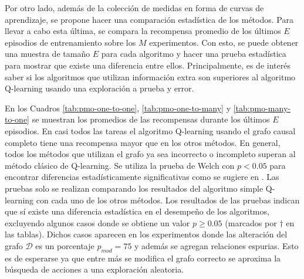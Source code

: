 Por otro lado, además de la colección de medidas en forma de curvas de aprendizaje, se propone hacer una comparación estadística de
los métodos. Para llevar a cabo esta última, se compara la recompensa promedio de los últimos $E$ episodios
de entrenamiento sobre los $M$ experimentos. Con esto, se 
puede obtener una muestra de tamaño $E$ para cada algoritmo
y hacer una prueba estadística para mostrar que existe una diferencia entre ellos. Principalmente, es de interés saber si los algoritmos que utilizan información extra son superiores 
al algoritmo Q-learning usando una exploración a prueba y error. 

En los Cuadros \ref{tab:pmo-one-to-one}, \ref{tab:pmo-one-to-many} y \ref{tab:pmo-many-to-one} se muestran
los promedios de las recompensas durante los últimos $E$ episodios. En casi todos las tareas el algoritmo Q-learning usando el grafo causal completo tiene una recompensa mayor que en los otros métodos. En general, todos los métodos que utilizan el grafo ya sea incorrecto o incompleto superan al método clásico de Q-learning. Se utiliza la prueba de Welch con $p < 0.05$ para encontrar diferencias estadísticamente significativas como se sugiere en \cite{colas2019hitchhikers}. Las pruebas solo se realizan comparando los resultados del algoritmo simple Q-learning con cada uno de los otros métodos. Los resultados de las pruebas indican que sí existe una diferencia estadística en el desempeño de los algoritmos, excluyendo algunos casos donde se obtiene un valor $p\geq 0.05$ (marcados por $\dagger$ en las tablas). Dichos casos aparecen en los experimentos donde las alteración del grafo $\mathcal{D}$ es un porcentaje $p_{mod} = 75$ y además se agregan relaciones espurias. Esto es de esperarse ya que entre más se modifica el grafo correcto se aproxima la búsqueda de acciones a una exploración aleatoria.
\newpage

